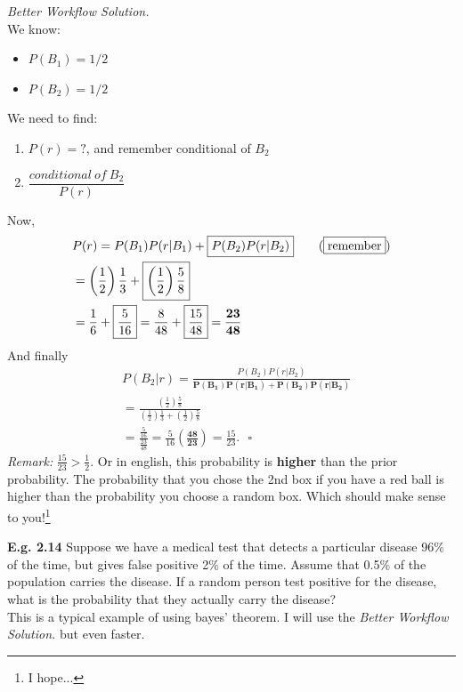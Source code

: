 \documentclass[12pt]{book}
\begin{document}
\noindent \textit{Better Workflow Solution.}\\
We know:
\begin{itemize}
\item $P(B_1)=1/2$
\item $P(B_2)=1/2$
\end{itemize}
We need to find:
\begin{enumerate}
\item $P(r)=?$, and remember conditional of $B_2$
\item $\dfrac{conditional~of~B_2}{P(r)}$
\end{enumerate}
Now,
\begin{align*}
& P(r)=P(B_1)P(r|B_1)+\boxed{P(B_2)P(r|B_2)}   \tag{$\boxed{\text{remember}}$}\\
& = \left( \frac{1}{2} \right) \frac{1}{3} + \boxed{\left( \frac{1}{2} \right) \frac{5}{8}}\\
& = \frac{1}{6} + \boxed{\frac{5}{16}} = \frac{8}{48} + \boxed{\frac{15}{48}} = \mathbf{\frac{23}{48}}
\end{align*}
And finally
\begin{align*}
& P(B_2|r)=\frac{\boxed{P(B_2)P(r|B_2)}}{\mathbf{P(B_1)P(r|B_1)+P(B_2)P(r|B_2)}}   \\
& = \frac{\left( \frac{1}{2} \right) \frac{5}{8}}{ \left( \frac{1}{2} \right) \frac{1}{3} + \left( \frac{1}{2} \right) \frac{5}{8}}\\
& = \frac{\frac{5}{16}}{\frac{23}{48}} = \boxed{\frac{5}{16}}\mathbf{\left(\frac{48}{23}\right)}=\frac{15}{23}.~~~\square
\end{align*}
\textit{Remark:} $\frac{15}{23}>\frac{1}{2}$. Or in english, this probability is \textbf{higher} than the prior probability. The probability that you chose the 2nd box if you have a red ball is higher than the probability you choose a random box. Which should make sense to you!\footnote{I hope...}

\textbf{E.g. 2.14} Suppose we have a medical test that detects a particular disease 96\% of the time, but gives false positive 2\% of the time. Assume that 0.5\% of the population carries the disease. If a random person test positive for the disease, what is the probability that they actually carry the disease?\\

This is a typical example of using bayes' theorem. I will use the \textit{Better Workflow Solution.} but even faster.\\
\end{document}
